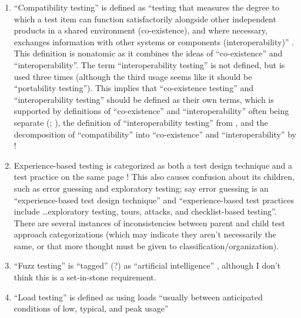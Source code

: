 \begin{enumerate}
      \item ``Compatibility testing'' is defined as ``testing that measures the
            degree to which a test item can function satisfactorily alongside
            other independent products in a shared environment (co-existence),
            and where necessary, exchanges information with other systems or
            components (interoperability)'' \citep[p.~3]{IEEE2022}. This
            definition is nonatomic as it combines the ideas of ``co-existence''
            and ``interoperability''. The term ``interoperability testing'' is
            not defined, but is used three times \citep[pp.~22, 43]{IEEE2022}
            (although the third usage seems like it should be ``portability
            testing''). This implies that ``co-existence testing'' and
            ``interoperability testing'' should be defined as their own terms,
            which is supported by definitions of ``co-existence'' and
            ``interoperability'' often being separate (;
            \citealp[pp.~73, 237]{IEEE2017}), the definition of
            ``interoperability testing'' from \citet[p.~238]{IEEE2017},
            and the decomposition of ``compatibility'' into ``co-existence''
            and ``interoperability'' by \citet{ISO_IEC2023a}!
      \item Experience-based testing is categorized as both a test design
            technique and a test practice on the same page
            \citep[p.~22]{IEEE2022}! This also causes confusion about
            its children, such as error guessing and exploratory testing;
            \citet[p.~34]{IEEE2022} say error guessing is an ``experience-based
            test design technique'' and ``experience-based test practices
            include \dots exploratory testing, tours, attacks, and
            checklist-based testing''. There are several instances of
            inconsistencies between parent and child test approach
            categorizations (which may indicate they aren't necessarily the
            same, or that more thought must be given to
            classification/organization).
      \item ``Fuzz testing'' is ``tagged'' (?) as ``artificial intelligence''
            \citep[p.~5]{IEEE2022}, although I don't think this is a
            set-in-stone requirement.
      \item ``Load testing'' is defined as using loads ``usually between
            anticipated conditions of low, typical, and peak usage''

\end{enumerate}
